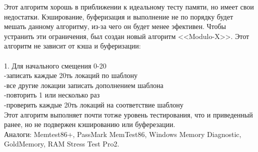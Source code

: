 \documentclass[a4paper,14pt]{extarticle}
\begin{document}
Этот алгоритм хорошь в приближении к идеальному тесту памяти, но имеет свои недостатки. Кэширование, буферизация и выполнение не по порядку будет мешать данному алгоритму, из-за чего он будет менее эфективен. Чтобы устранить эти ограничения, был создан новый алгоритм <<Modulo-X>>. Этот алгоритм не зависит от кэша и буферизации:\\ \\
1. Для начального смещения 0-20\\
 -записать каждые 20ть локаций по шаблону\\
 -все другие локации записать дополнением шаблона\\
 -повторить 1 или несколько раз\\
 -проверить каждые 20ть локаций на соответствие шаблону\\

Этот алгоритм выполняет почти тотже уровень тестирования, что и приведенный ранее, но не подвержен кэшированию или буферезации.\\

Аналоги: Memtest86+, PassMark MemTest86, Windows Memory Diagnostic, GoldMemory, RAM Stress Test Pro2.
\newpage
\end{document}
